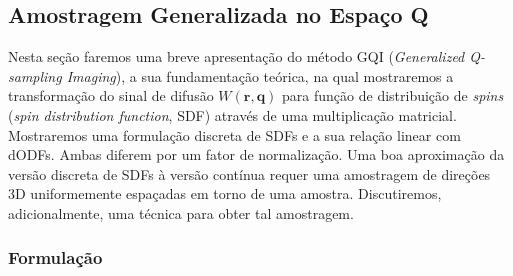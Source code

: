 \documentclass[
    12pt,                %
    oneside,            %
    a4paper,            %
    english,            %
    french,                %
    spanish,            %
    brazil                %
    ]{abntex2}
\begin{document}





\subsection{Amostragem Generalizada no Espaço Q}
\label{sec::gqi}

Nesta seção faremos uma breve apresentação do método GQI (\textit{Generalized Q-sampling Imaging}), a sua fundamentação teórica, na qual mostraremos a transformação do sinal de difusão $W(\mathbf{r},\mathbf{q})$ para função de distribuição de \textit{spins} (\textit{spin distribution function}, SDF) através de uma multiplicação matricial. Mostraremos uma formulação discreta de SDFs e a sua relação linear com dODFs. Ambas diferem 
por um fator de normalização. Uma boa aproximação da versão discreta de SDFs à versão contínua requer uma amostragem de direções 3D uniformemente espaçadas em torno de uma amostra. Discutiremos, adicionalmente, uma técnica para obter tal amostragem.


\subsubsection{Formulação}
\label{ssec::gqi_formulacao}
\end{document}
